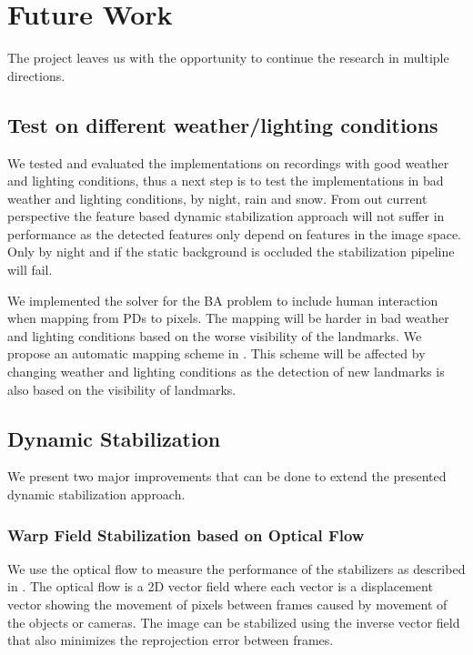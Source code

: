 
\section{Future Work}
The project leaves us with the opportunity to continue the research in multiple directions.

\subsection{Test on different weather/lighting conditions}
We tested and evaluated the implementations on recordings with good weather and lighting conditions, thus a next step is to test the implementations in bad weather and lighting conditions, \eg by night, rain and snow.
From out current perspective the feature based dynamic stabilization approach will not suffer in performance as the detected features only depend on features in the image space. 
Only by night and if the static background is occluded the stabilization pipeline will fail.

We implemented the solver for the BA problem to include human interaction when mapping from PDs to pixels.
The mapping will be harder in bad weather and lighting conditions based on the worse visibility of the landmarks.
We propose an automatic mapping scheme in .
This scheme will be affected by changing weather and lighting conditions as the detection of new landmarks is also based on the visibility of landmarks.


\subsection{Dynamic Stabilization}
We present two major improvements that can be done to extend the presented dynamic stabilization approach.

\subsubsection{Warp Field Stabilization based on Optical Flow}
We use the optical flow to measure the performance of the stabilizers as described in  .
The optical flow is a 2D vector field where each vector is a displacement vector showing the movement of pixels between frames caused by movement of the objects or cameras.
The image can be stabilized using the inverse vector field that also minimizes the reprojection error between frames.

